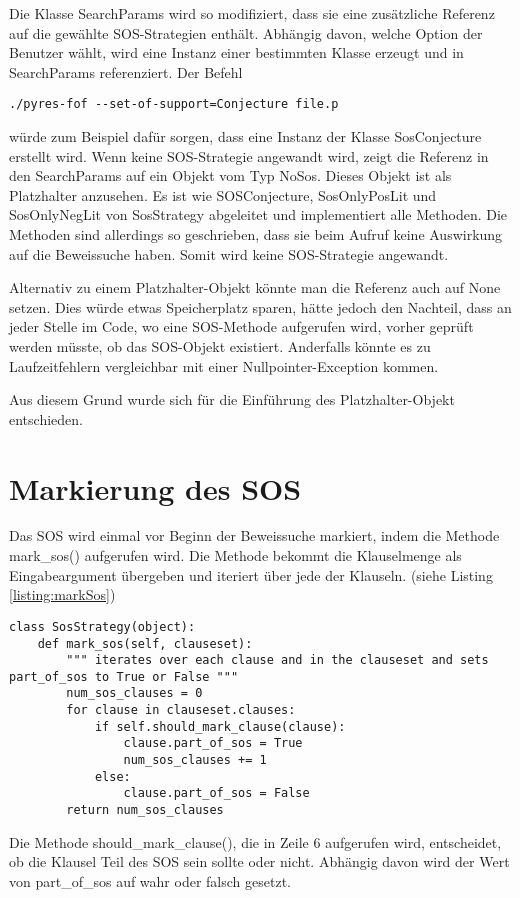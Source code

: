 Die Klasse SearchParams wird so modifiziert, dass sie eine zusätzliche Referenz auf die gewählte SOS-Strategien enthält. Abhängig davon, welche Option der Benutzer wählt, wird eine Instanz einer bestimmten Klasse erzeugt und in SearchParams referenziert. Der Befehl
\begin{lstlisting}
./pyres-fof --set-of-support=Conjecture file.p
\end{lstlisting}
würde zum Beispiel dafür sorgen, dass eine Instanz der Klasse SosConjecture erstellt wird. 
Wenn keine SOS-Strategie angewandt wird, zeigt die Referenz in den SearchParams auf ein Objekt vom Typ NoSos. Dieses Objekt ist als Platzhalter anzusehen. Es ist wie SOSConjecture, SosOnlyPosLit und SosOnlyNegLit von SosStrategy abgeleitet und implementiert alle Methoden. Die Methoden sind allerdings so geschrieben, dass sie beim Aufruf keine Auswirkung auf die Beweissuche haben. Somit wird keine SOS-Strategie angewandt.

Alternativ zu einem Platzhalter-Objekt könnte man die Referenz auch auf None setzen. Dies würde etwas Speicherplatz sparen, hätte jedoch den Nachteil, dass an jeder Stelle im Code, wo eine SOS-Methode aufgerufen wird, vorher geprüft werden müsste, ob das SOS-Objekt existiert. Anderfalls könnte es zu Laufzeitfehlern vergleichbar mit einer Nullpointer-Exception kommen. 

Aus diesem Grund wurde sich für die Einführung des Platzhalter-Objekt entschieden.
\section{Markierung des SOS}

Das SOS wird einmal vor Beginn der Beweissuche markiert, indem die Methode mark\_sos() aufgerufen wird. Die Methode bekommt die Klauselmenge als Eingabeargument übergeben und iteriert über jede der Klauseln. (siehe Listing \ref{listing:markSos})

\begin{lstlisting}[caption={Methode zur Markierung des SOS}, label={listing:markSos}]
class SosStrategy(object):
	def mark_sos(self, clauseset):
		""" iterates over each clause and in the clauseset and sets part_of_sos to True or False """
		num_sos_clauses = 0
		for clause in clauseset.clauses:
			if self.should_mark_clause(clause):
				clause.part_of_sos = True
				num_sos_clauses += 1
			else:
				clause.part_of_sos = False
		return num_sos_clauses
\end{lstlisting}

Die Methode should\_mark\_clause(), die in Zeile 6 aufgerufen wird, entscheidet, ob die Klausel Teil des SOS sein sollte oder nicht. Abhängig davon wird der Wert von part\_of\_sos auf wahr oder falsch gesetzt.


